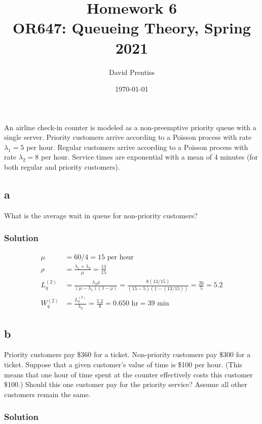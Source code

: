 \documentclass[letterpaper]{amsart}
\title[Homework 6]{Homework 6 \\ OR647: Queueing Theory, Spring 2021}
\author{David Prentiss}
\date{\today}
\begin{document}
\maketitle

\section{} %
An airline check-in counter is modeled as a non-preemptive priority queue with a
single server. Priority customers arrive according to a Poisson process with
rate $\lambda_1=5$ per hour. Regular customers arrive according to a Poisson process
with rate $\lambda_2=8$ per hour. Service times are exponential with a mean of 4
minutes (for both regular and priority customers).

\subsection*{a}
What is the average wait in queue for non-priority customers?
\subsubsection*{Solution}
\begin{align*}
  \mu &= 60/4=15\text{ per hour}\\
  \rho &=  \frac{\lambda_1+\lambda_2}{\mu} = \frac{13}{15}\\
  L_q^{(2)} &=\frac{\lambda_2\rho}{(\mu-\lambda_1)(1-\rho)}=\frac{8(13/15)}{(15-5)(1-(13/15))}
             = \frac{26}{5} = 5.2 \\
  W_q^{(2)} &= \frac{L_q^{(2)}}{\lambda_2} = \frac{5.2}{8} = 0.650\text{ hr} =
              39\text{ min}
\end{align*}

\subsection*{b}
Priority customers pay \$360 for a ticket. Non-priority customers pay \$300 for a ticket. Suppose that a given customer’s value of time is \$100 per hour. (This means that one hour of time spent at the counter effectively costs this customer \$100.) Should this one customer pay for the priority service? Assume all other customers remain the same.
\subsubsection*{Solution}
\end{document}
